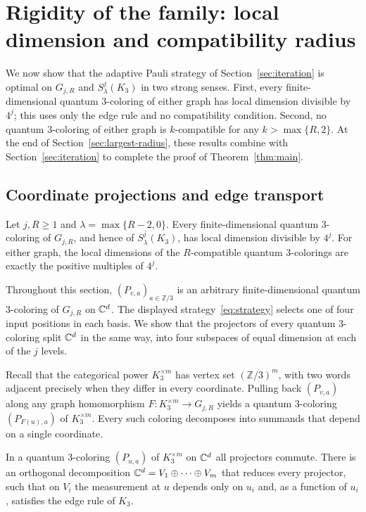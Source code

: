 \section{Rigidity of the family: local dimension and compatibility radius}\label{sec:rigidity}

We now show that the adaptive Pauli strategy of Section~\ref{sec:iteration} is optimal on $G_{j,R}$ and $S^j_\lambda(K_3)$ in two strong senses. First, every finite-dimensional quantum $3$-coloring of either graph has local dimension divisible by $4^j$; this uses only the edge rule and no compatibility condition. Second, no quantum $3$-coloring of either graph is $k$-compatible for any $k>\max\{R,2\}$. At the end of Section~\ref{sec:largest-radius}, these results combine with Section~\ref{sec:iteration} to complete the proof of Theorem~\ref{thm:main}.

\subsection{Coordinate projections and edge transport}\label{sec:coord-proj}

\begin{theorem}\label{thm:dimension}
Let $j,R\ge1$ and $\lambda=\max\{R-2,0\}$. Every finite-dimensional quantum $3$-coloring of $G_{j,R}$, and hence of $S^j_\lambda(K_3)$, has local dimension divisible by $4^j$. For either graph, the local dimensions of the $R$-compatible quantum $3$-colorings are exactly the positive multiples of $4^j$.
\end{theorem}

Throughout this section, $(P_{v,a})_{a\in\mathbb Z/3}$ is an arbitrary finite-dimensional quantum $3$-coloring of $G_{j,R}$ on $\mathbb C^d$. The displayed strategy~\eqref{eq:strategy} selects one of four input positions in each basis. We show that the projectors of every quantum $3$-coloring split $\mathbb C^d$ in the same way, into four subspaces of equal dimension at each of the $j$ levels.

Recall that the categorical power $K_3^{\times m}$ has vertex set $(\mathbb Z/3)^m$, with two words adjacent precisely when they differ in every coordinate. Pulling back $(P_{v,a})$ along any graph homomorphism $F:K_3^{\times m}\to G_{j,R}$ yields a quantum $3$-coloring $(P_{F(u),a})$ of $K_3^{\times m}$. Every such coloring decomposes into summands that depend on a single coordinate.

\begin{lemma}\label{lem:k3-powers}
In a quantum $3$-coloring $(P_{u,a})$ of $K_3^{\times m}$ on $\mathbb C^d$ all projectors commute. There is an orthogonal decomposition $\mathbb C^d=V_1\oplus\cdots\oplus V_m$ that reduces every projector, such that on $V_i$ the measurement at $u$ depends only on $u_i$ and, as a function of $u_i$, satisfies the edge rule of $K_3$.
\end{lemma}

